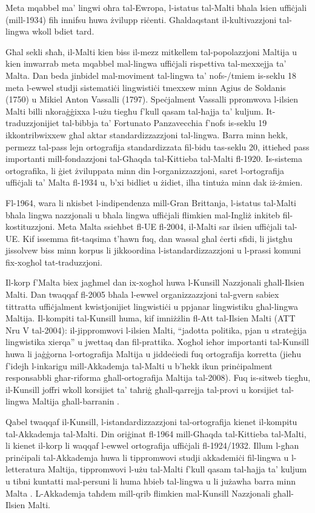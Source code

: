 \documentclass[]{../../metanetpaper}
\begin{document}
\begin{multicols}{2}
Meta mqabbel ma’ lingwi oħra tal-Ewropa, l-istatus tal-Malti bħala lsien uffiċjali (mill-1934) fih innifsu huwa żvilupp riċenti. Għaldaqstant il-kultivazzjoni tal-lingwa wkoll bdiet tard.

Għal sekli sħaħ, il-Malti kien biss il-mezz mitkellem tal-popolazzjoni Maltija u kien imwarrab meta mqabbel mal-lingwa uffiċjali rispettiva tal-mexxejja ta’ Malta. Dan beda jinbidel mal-moviment tal-lingwa ta’ nofs-/tmiem is-seklu 18 meta l-ewwel studji sistematiċi lingwistiċi tmexxew minn Agius de Soldanis (1750) u Mikiel Anton Vassalli (1797). Speċjalment Vassalli ppromwova l-ilsien Malti billi nkoraġġixxa l-użu tiegħu f'kull qasam tal-ħajja ta’ kuljum. It-traduzzjonijiet tal-bibbja ta’ Fortunato Panzavecchia f’nofs is-seklu 19 ikkontribwixxew għal aktar standardizzazzjoni tal-lingwa. Barra minn hekk, permezz tal-pass lejn ortografija standardizzata fil-bidu tas-seklu 20, ittieħed pass  importanti mill-fondazzjoni tal-Għaqda tal-Kittieba tal-Malti fl-1920. Is-sistema ortografika, li ġiet żviluppata minn din l-organizzazzjoni, saret l-ortografija uffiċjali ta’ Malta fl-1934 u, b'xi bidliet u żidiet, ilha tintuża minn dak iż-żmien.

Fl-1964, wara li nkisbet l-indipendenza mill-Gran Brittanja, l-istatus tal-Malti bħala lingwa nazzjonali u bħala lingwa uffiċjali flimkien mal-Ingliż inkiteb fil-kostituzzjoni. Meta Malta ssieħbet fl-UE fl-2004, il-Malti sar ilsien uffiċjali tal-UE. Kif issemma fit-taqsima t’hawn fuq, dan wassal għal ċerti sfidi, li jistgħu jissolvew biss minn korpus li jikkoordina l-istandardizzazzjoni u l-prassi komuni fix-xogħol tat-traduzzjoni.

Il-korp f'Malta biex jagħmel dan ix-xogħol huwa l-Kunsill Nazzjonali għall-Ilsien Malti. Dan twaqqaf fl-2005 bħala l-ewwel organizzazzjoni tal-gvern sabiex tittratta uffiċjalment kwistjonijiet lingwistiċi u ppjanar lingwistiku għal-lingwa Maltija. Il-kompiti tal-Kunsill huma, kif imniżżlin fl-Att tal-Ilsien Malti (ATT Nru V tal-2004): il-jippromwovi l-ilsien Malti, ``jadotta politika, pjan u strateġija lingwistika xierqa'' u jwettaq dan fil-prattika. Xogħol ieħor importanti tal-Kunsill huwa li jaġġorna l-ortografija Maltija u jiddeċiedi fuq ortografija korretta (jieħu f’idejh l-inkarigu mill-Akkademja tal-Malti u b’hekk ikun prinċipalment responsabbli għar-riforma għall-ortografija Maltija tal-2008). Fuq is-sitweb tiegħu, il-Kunsill joffri wkoll korsijiet ta’ taħriġ għall-qarrejja tal-provi u korsijiet tal-lingwa Maltija għall-barranin \cite{Kunsill1}.

Qabel twaqqaf il-Kunsill, l-istandardizzazzjoni tal-ortografija kienet il-kompitu tal-Akkademja tal-Malti. Din oriġinat fl-1964 mill-Għaqda tal-Kittieba tal-Malti, li kienet il-korp li waqqaf l-ewwel ortografija uffiċjali fl-1924/1932. Illum l-għan prinċipali tal-Akkademja huwa li tippromwovi studji akkademiċi fil-lingwa u l-letteratura Maltija, tippromwovi l-użu tal-Malti f’kull qasam tal-ħajja ta’ kuljum u tibni kuntatti mal-persuni li huma ħbieb tal-lingwa u li jużawha barra minn Malta \cite{Akkademja1}. L-Akkademja taħdem mill-qrib flimkien mal-Kunsill Nazzjonali għall-Ilsien Malti.


\end{multicols}
\end{document}
